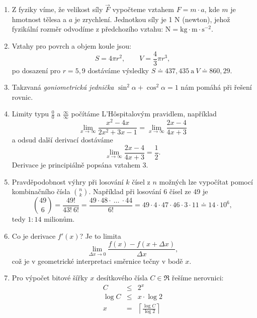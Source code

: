 \documentclass{article}
\begin{document}
\begin{enumerate}

\item Z fyziky víme, že velikost síly $\vec{F}$ vypočteme vztahem $F = m \cdot a$, kde $m$ je hmotnost tělesa a $a$ je zrychlení. Jednotkou síly je 1 N (newton), jehož fyzikální rozměr odvodíme z předchozího vztahu: $\mathrm{N = kg \cdot m \cdot s^{-2}}$.

\item Vztahy pro povrch a objem koule jsou:
$$S = 4\pi r^2,\qquad V = \frac{4}{3}\pi r^3,$$
po dosazení pro $r = 5{,}9$ dostáváme výsledky $S \doteq 437{,}435\ \mathrm a\ V \doteq 860{,}29$.

\item Takzvaná \emph{goniometrická jednička} $\sin^2\alpha + \cos^2\alpha = 1$ nám pomáhá při řešení rovnic.

\item Limity typu $\frac{0}{0}$ a $\frac{\infty}{\infty}$ počítáme L'H\^{o}spitalovým pravidlem, například
\begin{equation}
\lim_{x \rightarrow \infty} \frac{x^2 - 4x}{2x^2 + 3x - 1} = \lim_{x \rightarrow \infty} \frac{2x - 4}{4x + 3}
\end{equation}
a odsud další derivací dostáváme
\begin{equation}
\lim_{x \rightarrow \infty} \frac{2x - 4}{4x + 3} = \frac{1}{2}.
\end{equation}
Derivace je principiálně popsána vztahem 3.

\item Pravděpodobnost výhry při losování $k$ čísel z $n$ možných lze vypočítat pomocí kombinačního čísla $n \choose k$. Například při losování 6 čísel ze 49 je
$${49 \choose 6} = \frac{49!}{43!\ 6!} = \frac{49 \cdot 48 \cdot\ \ldots\ \cdot 44}{6!} = 49 \cdot 4 \cdot 47 \cdot 46 \cdot 3 \cdot 11 \doteq 14 \cdot 10^6,$$
tedy $1:14$ milionům.

\item Co je derivace $f'(x)$? Je to limita
\begin{equation}
\lim_{\Delta x \rightarrow 0}\frac{f(x) - f(x + \Delta x)}{\Delta x},
\end{equation}
což je v geometrické interpretaci směrnice tečny v bodě $x$.

\item Pro výpočet bitové šířky $x$ desítkového čísla $C \in \Re$ řešíme nerovnici:
$$\begin{array}{rcl}
C      &\leq & 2^x\\
\log C &\leq & x\cdot \log 2\\
x      &=    & \left \lceil \frac{\log C}{\log 2} \right \rceil
\end{array}$$


\end{enumerate}
\end{document}
